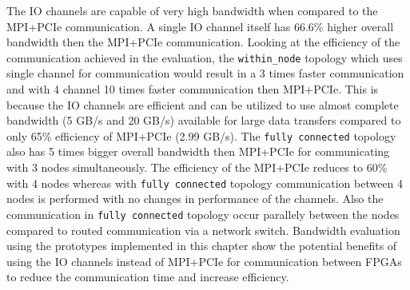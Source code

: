 The IO channels are capable of very high bandwidth when compared to the MPI+PCIe
communication. A single IO channel itself has 66.6\% higher overall bandwidth
then the MPI+PCIe communication. Looking at the efficiency of the communication achieved
in the evaluation, the \texttt{within_node} topology which uses single
channel for communication would result in a 3 times faster communication and with 4 channel
10 times faster communication then MPI+PCIe. This is because the IO channels are efficient
and can be utilized to use almost complete bandwidth (5 GB/s and 20 GB/s) available for large data transfers
compared to only 65\% efficiency of MPI+PCIe (2.99 GB/s). The \texttt{fully connected} topology
also has 5 times bigger overall bandwidth then MPI+PCIe for communicating with 3 nodes
simultaneously. The efficiency of the MPI+PCIe reduces to 60\% with 4 nodes whereas
with \texttt{fully connected} topology communication between 4 nodes is performed with
no changes in performance of the channels. Also the communication in \texttt{fully connected}
topology occur parallely between the nodes compared to routed communication via a network switch.
Bandwidth evaluation using the prototypes implemented in this chapter show the potential benefits
of using the IO channels instead of MPI+PCIe for communication between FPGAs to reduce the communication
time and increase efficiency.


